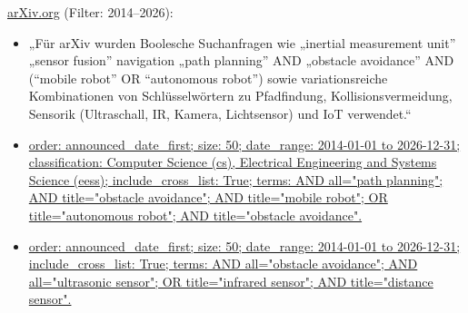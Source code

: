 \documentclass[
  a4paper,
  12pt,
  DIV=12,        %
  parskip=half,  %
  headings=small %
]{scrartcl}
\theoremstyle{definition}
\theoremstyle{definition}
\begin{document}
\href{http://arXiv.org}{arXiv.org} (Filter: 2014--2026):
\begin{itemize}

    \item „Für arXiv wurden Boolesche Suchanfragen wie „inertial measurement unit” „sensor fusion” navigation „path planning” AND „obstacle avoidance” AND (“mobile robot” OR “autonomous robot”) sowie variationsreiche Kombinationen von Schlüsselwörtern zu Pfadfindung, Kollisionsvermeidung, Sensorik (Ultraschall, IR, Kamera, Lichtsensor) und IoT verwendet.“

    \item \href{https://arxiv.org/search/advanced?terms-0-operator=AND&terms-0-term=%22path+planning%22&terms-0-field=all&terms-1-operator=AND&terms-1-term=%22obstacle+avoidance%22&terms-1-field=title&terms-2-operator=AND&terms-2-term=%22mobile+robot%22&terms-2-field=title&terms-3-operator=OR&terms-3-term=autonomous+robot&terms-3-field=title&terms-4-operator=AND&terms-4-term=obstacle+avoidance&terms-4-field=title&classification-computer_science=y&classification-eess=y&classification-physics_archives=all&classification-include_cross_list=include&date-year=&date-filter_by=date_range&date-from_date=2014&date-to_date=2026&date-date_type=submitted_date&abstracts=show&size=50&order=-announced_date_first}
    {order: announced\_date\_first; size: 50; date\_range: 2014-01-01 to 2026-12-31; classification: Computer Science (cs), Electrical Engineering and Systems Science (eess); include\_cross\_list: True; terms: AND all="path planning"; AND title="obstacle avoidance"; AND title="mobile robot"; OR title="autonomous robot"; AND title="obstacle avoidance".}

    \item \href{https://arxiv.org/search/advanced?terms-0-operator=AND&terms-0-term=%22obstacle+avoidance%22+&terms-0-field=all&terms-1-operator=AND&terms-1-term=ultrasonic+sensor&terms-1-field=all&terms-2-operator=OR&terms-2-term=infrared+sensor&terms-2-field=title&terms-3-operator=AND&terms-3-term=distance+sensor&terms-3-field=title&classification-physics_archives=all&classification-include_cross_list=include&date-year=&date-filter_by=date_range&date-from_date=2014&date-to_date=2026&date-date_type=submitted_date&abstracts=show&size=50&order=-announced_date_first}
    {order: announced\_date\_first; size: 50; date\_range: 2014-01-01 to 2026-12-31; include\_cross\_list: True; terms: AND all="obstacle avoidance"; AND all="ultrasonic sensor"; OR title="infrared sensor"; AND title="distance sensor".}


\end{itemize}
\end{document}
